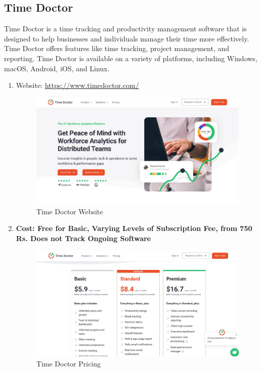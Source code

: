 \documentclass[openany]{report}
\begin{document}
\subsection{Time Doctor}
Time Doctor is a time tracking and productivity management software that is designed to help businesses and individuals manage their time more effectively. Time Doctor offers features like time tracking, project management, and reporting. Time Doctor is available on a variety of platforms, including Windows, macOS, Android, iOS, and Linux.

\begin{enumerate}
    \item Website: \url{https://www.timedoctor.com/}\\
          \begin{figure}[H]
              \centering
              \includegraphics[width=.95\textwidth]{time doctor.jpg}
              \caption{Time Doctor Website}
          \end{figure}

    \item \textbf{Cost: Free for Basic, Varying Levels of Subscription Fee, from 750 Rs. Does not Track Ongoing Software}

          \begin{figure}[H]
              \centering
              \includegraphics[width=.95\textwidth]{time doctor pricing.jpg}
              \caption{Time Doctor Pricing}
          \end{figure}


\end{enumerate}
\end{document}
